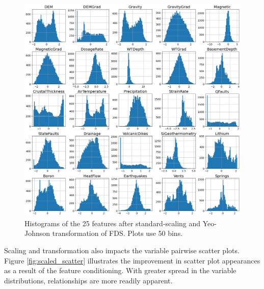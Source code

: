 \begin{figure}[!htp]
\centering
\includegraphics[width=\textwidth]{templates/images/Figure-Scaled_Histograms.png}
\caption[Conditioned FDS histograms]{Histograms of the 25 features after standard-scaling and Yeo-Johnson transformation of FDS. Plots use 50 bins.}
\label{fig:scaled_hist}
\end{figure}

Scaling and transformation also impacts the variable pairwise scatter plots. Figure \ref{fig:scaled_scatter} illustrates the improvement in scatter plot appearances as a result of the feature conditioning. With greater spread in the variable distributions, relationships are more readily apparent.

